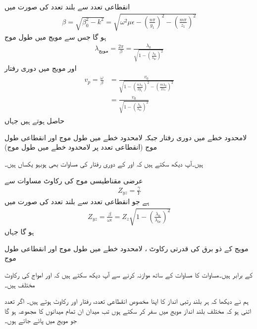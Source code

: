 انقطاعی تعدد سے بلند تعدد  کی صورت میں
\begin{align}
\beta=\sqrt{\beta_0^2-k^2}=\sqrt{\omega^2 \mu \epsilon-\left(\frac{n\pi}{y_1}\right)^2-\left(\frac{m\pi}{z_1}\right)^2}
\end{align}
ہو گا جس سے مویج میں طول موج
\begin{align}
\lambda_{\text{مویج}}=\frac{2\pi}{\beta}=\frac{\lambda_0}{\sqrt{1-\left(\frac{\lambda_0}{\lambda_{0c}}\right)^2}}
\end{align}
اور مویج میں  دوری رفتار
\begin{gather}
\begin{aligned}
v_p=\frac{\omega}{\beta}&=\frac{v_0}{\sqrt{1-\left(\frac{n\lambda_0}{2y_1}\right)^2-\left(\frac{m\lambda_0}{2z_1}\right)^2}}\\
&=\frac{v_0}{\sqrt{1-\left(\frac{\lambda_0}{\lambda_{0c}}\right)^2}}
\end{aligned}
\end{gather}
حاصل ہوتے ہیں جہاں
\begin{description}
 لامحدود خطے میں دوری رفتار  جبکہ 
 لامحدود خطے میں طول موج اور
 انقطاعی طول موج (انقطاعی تعدد پر لامحدود خطے میں طول موج)
\end{description}
ہیں۔آپ دیکھ سکتے ہیں کہ  اور  کے دوری رفتار کی مساوات بھی ہوبہو یکساں ہیں۔

عرضی مقناطیسی موج کی رکاوٹ مساوات  سے 
\begin{align*}
Z_{yz}=\frac{\gamma}{Y}
\end{align*}
ہے جو انقطاعی تعدد سے بلند تعدد  کی صورت میں
\begin{align}\label{مساوات_مویج_عرضی_مقناطیسی_رکاوٹ_حتمی}
Z_{yz}=\frac{\beta}{\omega \epsilon}=Z_z \sqrt{1-\left(\frac{\lambda_0}{\lambda_{0c}}\right)^2}
\end{align}
ہو گا جہاں
\begin{description}
 مویج کے ذو برق کی قدرتی رکاوٹ ، 
 لامحدود خطے میں طول موج اور
 انقطاعی طول موج
\end{description}
کے برابر ہیں۔مساوات  کا مساوات  کے ساتھ موازنہ کرنے سے آپ دیکھ سکتے ہیں کہ  اور  امواج کی رکاوٹ مختلف ہیں۔

ہم نے دیکھا کہ ہر بلند رتبی انداز کا اپنا مخصوص انقطاعی تعدد، رفتار اور رکاوٹ ہوتے ہیں۔ اگر تعدد اتنی ہو کہ مختلف بلند انداز مویج میں سفر کر سکتے ہوں تب میدان ان تمام میدانوں کا مجموعہ ہو گا جو مویج میں پائے جاتے ہوں۔ 

